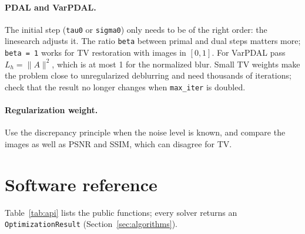 \documentclass[11pt,a4paper]{article}
\newcommand{\code}[1]{\texttt{#1}}
\begin{document}
\paragraph{PDAL and VarPDAL.} The initial step (\code{tau0} or
\code{sigma0}) only needs to be of the right order: the linesearch adjusts
it. The ratio \code{beta} between primal and dual steps matters more;
\code{beta = 1} works for TV restoration with images in $[0,1]$. For
VarPDAL pass $L_h=\|A\|^2$, which is at most 1 for the normalized blur.
Small TV weights make the problem close to unregularized deblurring and need
thousands of iterations; check that the result no longer changes when
\code{max\_iter} is doubled.

\paragraph{Regularization weight.} Use the discrepancy principle when the
noise level is known, and compare the images as well as PSNR and SSIM, which
can disagree for TV.

\section{Software reference}

Table~\ref{tab:api} lists the public functions; every solver returns an
\code{OptimizationResult} (Section~\ref{sec:algorithms}).
\end{document}
